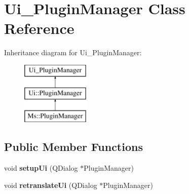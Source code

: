 \hypertarget{class_ui___plugin_manager}{}\section{Ui\+\_\+\+Plugin\+Manager Class Reference}
\label{class_ui___plugin_manager}
Inheritance diagram for Ui\+\_\+\+Plugin\+Manager\+:\begin{figure}[H]
\begin{center}
\leavevmode
\includegraphics[height=3.000000cm]{class_ui___plugin_manager}
\end{center}
\end{figure}
\subsection*{Public Member Functions}
\begin{DoxyCompactItemize}
\item 
\mbox{\label{class_ui___plugin_manager_affae03b58a856cc8f79556a866daa767}} 
void {\bfseries setup\+Ui} (Q\+Dialog $\ast$Plugin\+Manager)
\item 
\mbox{\label{class_ui___plugin_manager_a50beadcdcd670e10874511c2d90e2bea}} 
void {\bfseries retranslate\+Ui} (Q\+Dialog $\ast$Plugin\+Manager)
\end{DoxyCompactItemize}
